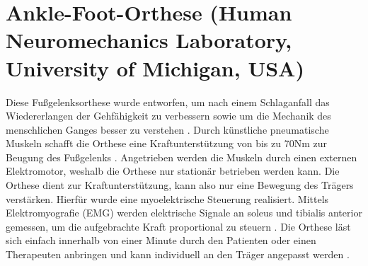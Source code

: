 \section{Ankle-Foot-Orthese (Human Neuromechanics Laboratory, University of Michigan, USA)}
Diese Fußgelenksorthese wurde entworfen, um nach einem Schlaganfall das Wiedererlangen der Gehfähigkeit zu verbessern sowie um die Mechanik des menschlichen Ganges besser zu verstehen \citep{Ferris.2005}. Durch künstliche pneumatische Muskeln schafft die Orthese eine Kraftunterstützung von bis zu 70Nm zur Beugung des Fußgelenks \citep{Gordon.2007}. Angetrieben werden die Muskeln durch einen externen Elektromotor, weshalb die Orthese nur stationär betrieben werden kann. Die Orthese dient zur Kraftunterstützung, kann also nur eine Bewegung des Trägers verstärken. Hierfür wurde eine myoelektrische Steuerung realisiert. Mittels Elektromyografie (EMG) werden elektrische Signale an soleus und tibialis anterior gemessen, um die aufgebrachte Kraft proportional zu steuern \citep{Ferris.2017}. Die Orthese läst sich einfach innerhalb von einer Minute durch den Patienten oder einen Therapeuten anbringen und kann individuell an den Träger angepasst werden \citep{Ferris.2006}. 